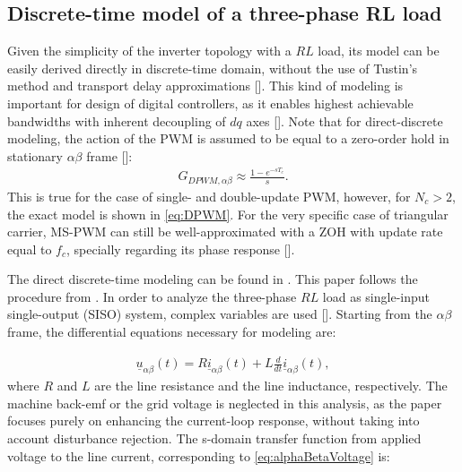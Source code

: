 \documentclass[journal]{IEEEtran}
\begin{document}
\subsection{Discrete-time model of a three-phase RL load}

Given the simplicity of the inverter topology with a $RL$ load, its model can be easily derived directly in discrete-time domain, without the use of Tustin's method and transport delay approximations []. This kind of modeling is important for design of digital controllers, as it enables highest achievable bandwidths with inherent decoupling of $dq$ axes []. 
Note that for direct-discrete modeling, the action of the PWM is assumed to be equal to a zero-order hold in stationary $\alpha \beta$ frame []:
\begin{equation}
\begin{aligned}
G_{DPWM,\alpha \beta} \approx \frac{1-e^{-sT_c}}{s}.
\label{eq:DPWMAlphaBeta} 
\end{aligned}    
\end{equation}
 This is true for the case of single- and double-update PWM, however, for $N_c>2$, the exact model is shown in \eqref{eq:DPWM}. For the very specific case of triangular carrier, MS-PWM can still be well-approximated with a ZOH with update rate equal to $f_c$, specially regarding its phase response [].

The direct discrete-time modeling can be found in \cite{lorenz2010,vuksa2016,commentsHoffmann}. This paper follows the procedure from \cite{commentsHoffmann}.
In order to analyze the three-phase $RL$ load as single-input single-output (SISO) system, complex variables are used []. 
Starting from the $\alpha \beta$ frame, the differential equations necessary for modeling are:

\begin{equation}
\begin{aligned}
\underline{u}_{\alpha \beta} (t) = R \underline{i}_{\alpha \beta} (t) + L \frac{d}{dt} \underline{i}_{\alpha \beta} (t),
\label{eq:alphaBetaVoltage} 
\end{aligned}    
\end{equation}
where $R$ and $L$ are the line resistance and the line inductance, respectively. The machine back-emf or the grid voltage is neglected in this analysis, as the paper focuses purely on enhancing the current-loop response, without taking into account disturbance rejection.
The s-domain transfer function from applied voltage to the line current, corresponding to \eqref{eq:alphaBetaVoltage} is:
\end{document}
